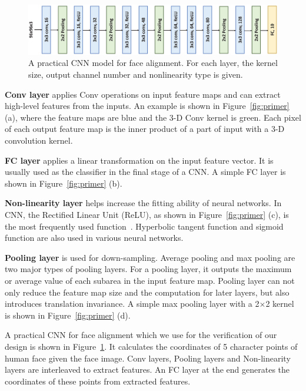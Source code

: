 \documentclass[10pt, conference, compsocconf]{IEEEtran}
\begin{document}
\begin{figure}[h]
  \centering
  \includegraphics[width=1.8\columnwidth]{figure/alignment_net.eps}
  \small
  \caption{A practical CNN model for face alignment. For each layer, the kernel size, output channel number and nonlinearity type is given.}
  \label{fig:face_align_net}
\end{figure}

\textbf{Conv layer} applies Conv operations on input feature maps and can extract high-level features from the inputs. An example is shown in Figure~\ref{fig:primer} (a), where the feature maps are blue and the 3-D Conv kernel is green. Each pixel of each output feature map is the inner product of a part of input with a 3-D convolution kernel.

\textbf{FC layer} applies a linear transformation on the input feature vector. It is usually used as the classifier in the final stage of a CNN. A simple FC layer is shown in Figure~\ref{fig:primer} (b).

\textbf{Non-linearity layer} helps increase the fitting ability of neural networks. In CNN, the Rectified Linear Unit (ReLU), as shown in Figure~\ref{fig:primer} (c), is the most frequently used function~\cite{krizhevsky2012imagenet}. Hyperbolic tangent function and sigmoid function are also used in various neural networks.

\textbf{Pooling layer} is used for down-sampling. Average pooling and max pooling are two major types of pooling layers. For a pooling layer, it outputs the maximum or average value of each subarea in the input feature map. Pooling layer can not only reduce the feature map size and the computation for later layers, but also introduces translation invariance. A simple max pooling layer with a 2$\times$2 kernel is shown in Figure~\ref{fig:primer} (d).

A practical CNN for face alignment which we use for the verification of our design is shown in Figure~\ref{fig:face_align_net}. It calculates the coordinates of 5 character points of human face given the face image. Conv layers, Pooling layers and Non-linearity layers are interleaved to extract features. An FC layer at the end generates the coordinates of these points from extracted features.
\end{document}
